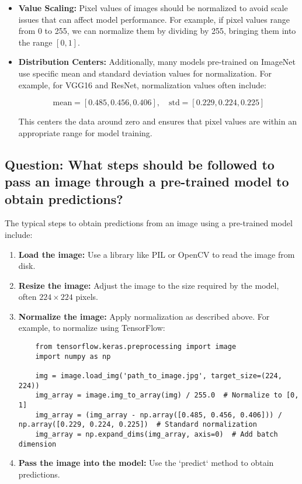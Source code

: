 \documentclass{article}
\begin{document}
\begin{itemize}
    \item \textbf{Value Scaling:} Pixel values of images should be normalized to avoid scale issues that can affect model performance. For example, if pixel values range from 0 to 255, we can normalize them by dividing by 255, bringing them into the range \([0, 1]\).
    \item \textbf{Distribution Centers:} Additionally, many models pre-trained on ImageNet use specific mean and standard deviation values for normalization. For example, for VGG16 and ResNet, normalization values often include:

    \[
    \text{mean} = [0.485, 0.456, 0.406], \quad \text{std} = [0.229, 0.224, 0.225]
    \]

    This centers the data around zero and ensures that pixel values are within an appropriate range for model training.
\end{itemize}

\subsection{Question: What steps should be followed to pass an image through a pre-trained model to obtain predictions?}

\justify
The typical steps to obtain predictions from an image using a pre-trained model include:

\begin{enumerate}
    \item \textbf{Load the image:} Use a library like PIL or OpenCV to read the image from disk.
    
    \item \textbf{Resize the image:} Adjust the image to the size required by the model, often \(224 \times 224\) pixels.
    
    \item \textbf{Normalize the image:} Apply normalization as described above. For example, to normalize using TensorFlow:
    
    \begin{lstlisting}
    from tensorflow.keras.preprocessing import image
    import numpy as np

    img = image.load_img('path_to_image.jpg', target_size=(224, 224))
    img_array = image.img_to_array(img) / 255.0  # Normalize to [0, 1]
    img_array = (img_array - np.array([0.485, 0.456, 0.406])) / np.array([0.229, 0.224, 0.225])  # Standard normalization
    img_array = np.expand_dims(img_array, axis=0)  # Add batch dimension
    \end{lstlisting}
    
    \item \textbf{Pass the image into the model:} Use the `predict` method to obtain predictions.
\end{enumerate}
\end{document}
